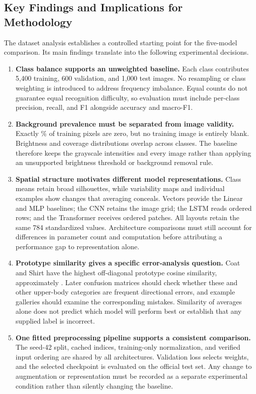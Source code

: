 \subsection{Key Findings and Implications for Methodology}
\label{sec:key_findings}
The dataset analysis establishes a controlled starting point for the five-model
comparison. Its main findings translate into the following experimental
decisions.

\begin{enumerate}
\item \textbf{Class balance supports an unweighted baseline.}
Each class contributes 5,400 training, 600 validation, and 1,000 test images.
No resampling or class weighting is introduced to address frequency imbalance.
Equal counts do not guarantee equal recognition difficulty, so evaluation
must include per-class precision, recall, and F1 alongside accuracy and macro-F1.

\item \textbf{Background prevalence must be separated from image validity.}
Exactly \ZeroPercent\% of training pixels are zero, but no training image
is entirely blank. Brightness and coverage distributions overlap across
classes. The baseline therefore keeps the grayscale intensities and every
image rather than applying an unsupported brightness threshold or background
removal rule.

\item \textbf{Spatial structure motivates different model representations.}
Class means retain broad silhouettes, while variability maps and individual
examples show changes that averaging conceals. Vectors provide the Linear
and MLP baselines; the CNN retains the image grid; the LSTM reads ordered
rows; and the Transformer receives ordered patches. All layouts retain the
same 784 standardized values. Architecture comparisons must still account
for differences in parameter count and computation before attributing a
performance gap to representation alone.

\item \textbf{Prototype similarity gives a specific error-analysis question.}
Coat and Shirt have the highest off-diagonal prototype cosine similarity,
approximately \MostSimilarCosine{}. Later confusion matrices should check
whether these and other upper-body categories are frequent directional
errors, and example galleries should examine the corresponding mistakes.
Similarity of averages alone does not predict which model will perform best
or establish that any supplied label is incorrect.

\item \textbf{One fitted preprocessing pipeline supports a consistent comparison.}
The seed-42 split, cached indices, training-only normalization, and verified
input ordering are shared by all architectures. Validation loss selects
weights, and the selected checkpoint is evaluated on the official test set.
Any change to augmentation or representation must be recorded as a separate
experimental condition rather than silently changing the baseline.
\end{enumerate}


